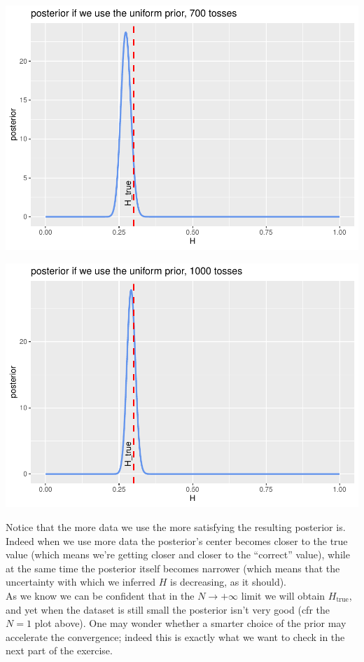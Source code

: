 \documentclass[
]{article}
\begin{document}
\begin{center}\includegraphics[width=0.75\linewidth]{astrostat-1_files/figure-latex/unnamed-chunk-7-1} \end{center}

\begin{center}\includegraphics[width=0.75\linewidth]{astrostat-1_files/figure-latex/unnamed-chunk-8-1} \end{center}

Notice that the more data we use the more satisfying the resulting
posterior is. Indeed when we use more data the posterior's center
becomes closer to the true value (which means we're getting closer and
closer to the ``correct'' value), while at the same time the posterior
itself becomes narrower (which means that the uncertainty with which we
inferred \(H\) is decreasing, as it should).\\
As we know we can be confident that in the \(N \to + \infty\) limit we
will obtain \(H_{\text{true}}\), and yet when the dataset is still small
the posterior isn't very good (cfr the \(N=1\) plot above). One may
wonder whether a smarter choice of the prior may accelerate the
convergence; indeed this is exactly what we want to check in the next
part of the exercise.
\end{document}
